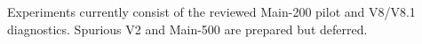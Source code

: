 Experiments currently consist of the reviewed Main-200 pilot and V8/V8.1 diagnostics. Spurious V2 and Main-500 are prepared but deferred.
